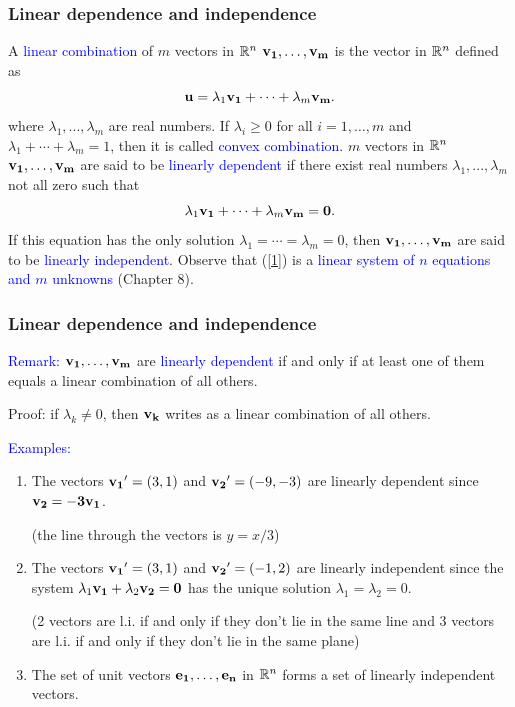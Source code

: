 \documentclass[11pt,aspectratio=169]{beamer}
\begin{document}
\begin{frame}
\frametitle{Linear dependence and independence}
\begin{small}

A \textcolor{blue}{linear combination} of $m$ vectors in $\mathbb R^n$ ${\bf v_1},\dots, \bf{v}_m$ is the vector in $\mathbb R^n$ defined as
$$
{\bf u}= \lambda_1{\bf  v_1}+\cdots +\lambda_m {\bf v_m}.
$$
where $\lambda_1,...,\lambda_m$ are real numbers.
\vskip 12pt
If $\lambda_i \geq 0$ for all $i=1,\dots,m$ and $\lambda_1+\cdots+\lambda_m=1$, then it is called \textcolor{blue}{convex combination}.
\vskip 12pt
$m$ vectors in $\mathbb R^n$ $\bf{v}_1,\dots, \bf{v}_m$ are said to be \textcolor{blue}{linearly dependent} if there exist real numbers $\lambda_1,...,\lambda_m$ not all zero such that
\begin{equation} \label{1}
 \lambda_1{\bf v_1}+\cdots +\lambda_m {\bf v_m}=\bf{0}.
\end{equation}
If this equation
has the only solution $\lambda_1=\cdots =\lambda_m=0$, then $\bf{v}_1,\dots, \bf{v}_m$ are said to be \textcolor{blue}{linearly independent}.
\vskip 12pt
Observe that (\ref{1}) is a \textcolor{blue}{linear system of $n$ equations and $m$ unknowns} (Chapter 8).


\end{small}
\end{frame}\begin{frame}
\frametitle{Linear dependence and independence}
\begin{small}
\textcolor{blue}{Remark:} $\bf{v}_1,\dots, \bf{v}_m$ are \textcolor{blue}{linearly dependent} if and only if at least one of them equals a linear combination of all others.

\begin{tiny}Proof: if $\lambda_k \neq 0$, then $\bf{v}_k$ writes as  a linear combination of all others.\end{tiny}

\vskip 12pt
\textcolor{blue}{Examples:} 
\begin{enumerate}
\item The vectors ${\bf v_1}'=(3,1)$ and ${\bf  v_2}'=(-9,-3)$ are linearly dependent since $\bf{v}_2=-3\bf{v}_1$.\begin{tiny} (the line through the vectors is $y=x/3$)\end{tiny}
\vskip 11pt
\item The vectors ${\bf v_1}'=(3,1)$ and ${\bf v_2}'=(-1,2)$ are linearly independent since the system $\lambda_1 {\bf v_1}+\lambda_2 \bf{v}_2=\bf{0}$ has the unique solution $\lambda_1=\lambda_2=0$.\begin{tiny} (2 vectors are l.i. if and only if they don't lie in the same line and 3 vectors are l.i. if and only if they don't lie in the same plane) \end{tiny}
\vskip 11pt
\item The set of unit vectors $\bf{e}_1, \dots, \bf{e}_n$ in $\mathbb R^n$ forms a set of linearly independent vectors. 
\end{enumerate}



\end{small}
\end{frame}
\end{document}
